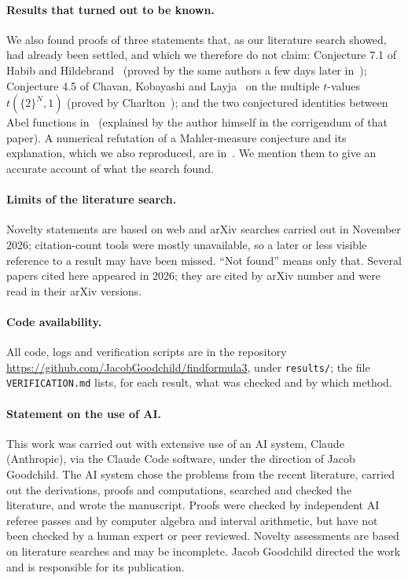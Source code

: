\paragraph{Results that turned out to be known.} We also found proofs of three statements that, as our literature search showed, had already been settled, and which we therefore do not claim: Conjecture 7.1 of Habib and Hildebrand~\cite{HH} (proved by the same authors a few days later in~\cite{HH2}); Conjecture 4.5 of Chavan, Kobayashi and Layja~\cite{CKL} on the multiple $t$-values $t(\{2\}^N,1)$ (proved by Charlton~\cite{Charlton}); and the two conjectured identities between Abel functions in~\cite{FinchAB} (explained by the author himself in the corrigendum of that paper). A numerical refutation of a Mahler-measure conjecture and its explanation, which we also reproduced, are in~\cite{Zheng}. We mention them to give an accurate account of what the search found.

\paragraph{Limits of the literature search.} Novelty statements are based on web and arXiv searches carried out in November 2026; citation-count tools were mostly unavailable, so a later or less visible reference to a result may have been missed. ``Not found'' means only that. Several papers cited here appeared in 2026; they are cited by arXiv number and were read in their arXiv versions.

\paragraph{Code availability.} All code, logs and verification scripts are in the repository \url{https://github.com/JacobGoodchild/findformula3}, under \texttt{results/}; the file \texttt{VERIFICATION.md} lists, for each result, what was checked and by which method.

\paragraph{Statement on the use of AI.}
This work was carried out with extensive use of an AI system, Claude (Anthropic), via the Claude Code software, under the direction of Jacob Goodchild. The AI system chose the problems from the recent literature, carried out the derivations, proofs and computations, searched and checked the literature, and wrote the manuscript. Proofs were checked by independent AI referee passes and by computer algebra and interval arithmetic, but have not been checked by a human expert or peer reviewed. Novelty assessments are based on literature searches and may be incomplete. Jacob Goodchild directed the work and is responsible for its publication.

